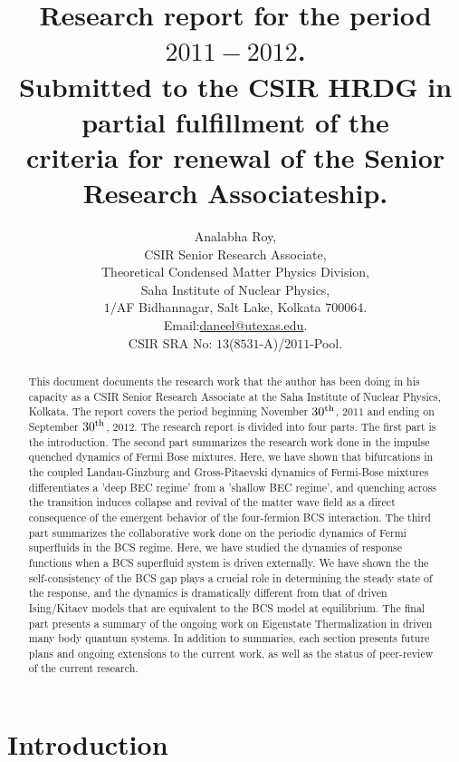\documentclass[a4paper,10pt]{report}
\title{Research report for the period $2011-2012$.\\
Submitted to the CSIR HRDG in partial fulfillment of the\\ 
criteria for renewal of the Senior Research Associateship.
}
\author{Analabha Roy,\\
CSIR Senior Research Associate,\\
Theoretical Condensed Matter Physics Division,\\
Saha Institute of Nuclear Physics,\\
$1/$AF Bidhannagar, Salt Lake, Kolkata $700064$.\\
Email:\url{daneel@utexas.edu}.\\
CSIR SRA No: $13$($8531$-A)/$2011$-Pool.
}
\begin{document}
\maketitle

\begin{abstract}
This document documents the research work that the author has been doing in his capacity as a CSIR Senior Research Associate at the Saha Institute of Nuclear Physics, Kolkata. The report covers the period beginning November $30^{\rm th}$, $2011$ and ending on September $30^{\rm th}$, $2012$. The research report is divided into four parts. The first part is the introduction. The second part summarizes the research work done in the impulse quenched dynamics of Fermi Bose mixtures. Here, we have shown that bifurcations in the coupled Landau-Ginzburg and Gross-Pitaevski dynamics of Fermi-Bose mixtures differentiates a 'deep BEC regime' from a 'shallow BEC regime', and quenching across the transition induces collapse and revival of the matter wave field as a direct consequence of the emergent behavior of the four-fermion BCS interaction. The third part summarizes the collaborative work done on the periodic dynamics of Fermi superfluids in the BCS regime. Here, we have studied the dynamics of response functions 
when a BCS superfluid system is driven externally. We have shown the the self-consistency of the BCS gap plays a crucial role in determining the steady state of the response, and the dynamics is dramatically different from that of driven Ising/Kitaev models that are equivalent to the BCS model at equilibrium. The final part presents a summary of the ongoing work on Eigenstate Thermalization in driven many body quantum systems. In addition to summaries, each section presents future plans and ongoing extensions to the current work, as well as the status of peer-review of the current research.
\end{abstract}
\section{\sc Introduction}
\label{sec:intro}
\end{document}
